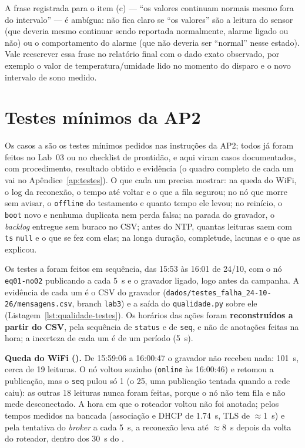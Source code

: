 \begin{orientacao}
A frase registrada para o item (c) --- \enquote{os valores continuam
normais mesmo fora do intervalo} --- é ambígua: não fica claro se
\enquote{os valores} são a leitura do sensor (que deveria mesmo continuar
sendo reportada normalmente, alarme ligado ou não) ou o comportamento do
alarme (que não deveria ser \enquote{normal} nesse estado). Vale reescrever
essa frase no relatório final com o dado exato observado, por exemplo o
valor de temperatura/umidade lido no momento do disparo e o novo intervalo
de sono medido.
\end{orientacao}

\section{Testes mínimos da AP2}
\label{sec:testes-ap2}

\begin{orientacao}
Os casos  a  são os testes mínimos pedidos nas instruções
da AP2; todos já foram feitos no Lab~03 ou no checklist de prontidão, e
aqui viram casos documentados, com procedimento, resultado obtido e
evidência (o quadro completo de cada um vai no
Apêndice~\ref{ap:testes}). O que cada um precisa mostrar: na queda do
WiFi, o log da reconexão, o tempo até voltar e o que a fila segurou; no
nó que morre sem avisar, o \texttt{offline} do testamento e quanto
tempo ele levou; no reinício, o \texttt{boot} novo e nenhuma duplicata
nem perda falsa; na parada do gravador, o \emph{backlog} entregue sem
buraco no CSV; antes do NTP, quantas leituras saem com \texttt{ts}
\texttt{null} e o que se fez com elas; na longa duração, completude,
lacunas e o que as explicou.
\end{orientacao}

Os testes  a  foram feitos em sequência, das 15:53 às
16:01 de 24/10, com o nó \texttt{eq01-no02} publicando a cada
\SI{5}{\second} e o gravador ligado, logo antes da campanha. A evidência
de cada um é o CSV do gravador
(\texttt{dados/testes\_falha\_24-10-26/mensagens.csv}, branch
\texttt{lab3}) e a saída do \texttt{qualidade.py} sobre ele
(Listagem~\ref{lst:qualidade-testes}). Os horários das ações foram
\textbf{reconstruídos a partir do CSV}, pela sequência de
\texttt{status} e de \texttt{seq}, e não de anotações feitas na hora;
a incerteza de cada um é de um período (\SI{5}{\second}).

\textbf{Queda do WiFi ().} De 15:59:06 a 16:00:47 o gravador não
recebeu nada: \SI{101}{\second}, cerca de 19 leituras. O nó voltou
sozinho (\texttt{online} às 16:00:46) e retomou a publicação, mas o
\texttt{seq} pulou só 1 (o 25, uma publicação tentada quando a rede
caiu): as outras 18 leituras nunca foram feitas, porque o nó não tem
fila e não mede desconectado. A hora em que o roteador voltou não foi
anotada; pelos tempos medidos na bancada (associação e DHCP de
\SI{1,74}{\second}, TLS de $\approx$\SI{1}{\second}) e pela tentativa do
\emph{broker} a cada \SI{5}{\second}, a reconexão leva até
$\approx$\SI{8}{\second} depois da volta do roteador, dentro dos
\SI{30}{\second} do .

